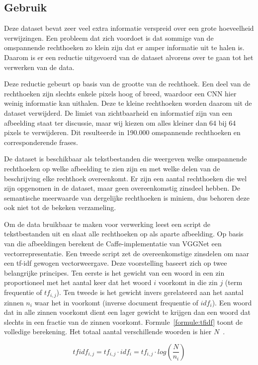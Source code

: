 \subsection{Gebruik}
\label{sub:Gebruik}
Deze dataset bevat zeer veel extra informatie verspreid over een grote hoeveelheid verwijzingen. Een probleem dat zich voordoet is dat sommige van de omspannende rechthoeken zo klein zijn dat er amper informatie uit te halen is. Daarom is er een reductie uitgevoerd van de dataset alvorens over te gaan tot het verwerken van de data. 

Deze reductie gebeurt op basis van de grootte van de rechthoek. Een deel van de rechthoeken zijn slechts enkele pixels hoog of breed, waardoor een CNN hier weinig informatie kan uithalen. Deze te kleine rechthoeken worden daarom uit de dataset verwijderd. De limiet van zichtbaarheid en informatief zijn van een afbeelding staat ter discussie, maar wij kiezen om alles kleiner dan 64 bij 64 pixels te verwijderen. Dit resulteerde in 190.000 omspannende rechthoeken en corresponderende frases. 

De dataset is beschikbaar als tekstbestanden die weergeven welke omspannende rechthoeken op welke afbeelding te zien zijn en met welke delen van de beschrijving elke rechthoek overeenkomt. Er zijn een aantal rechthoeken die wel zijn opgenomen in de dataset, maar geen overeenkomstig zinsdeel hebben. De semantische meerwaarde van dergelijke rechthoeken is miniem, dus behoren deze ook niet tot de bekeken verzameling. 

Om de data bruikbaar te maken voor verwerking leest een script de tekstbestanden uit en slaat alle rechthoeken op als aparte afbeelding. Op basis van die afbeeldingen berekent de Caffe-implementatie van VGGNet een vectorrepresentatie. Een tweede script zet de overeenkomstige zinsdelen om naar een tf-idf gewogen vectorweergave. Deze voorstelling baseert zich op twee belangrijke principes. Ten eerste is het gewicht van een woord in een zin proportioneel met het aantal keer dat het woord $i$ voorkomt in die zin $j$ (term frequentie of $tf_{i,j}$). Ten tweede is het gewicht invers gerelateerd aan het aantal zinnen $n_i$ waar het in voorkomt (inverse document frequentie of $idf_i$). Een woord dat in alle zinnen voorkomt dient een lager gewicht te krijgen dan een woord dat slechts in een fractie van de zinnen voorkomt. Formule~\eqref{formule:tfidf} toont de volledige berekening. Het totaal aantal verschillende woorden is hier $N$~\cite{Jurafsky:2009:SLP:1214993}. 

\begin{equation}
\label{formule:tfidf}
	tfidf_{i,j} = tf_{i,j}\cdot{idf_{i}} = tf_{i,j}\cdot{log(\frac{N}{n_i})}
\end{equation}

